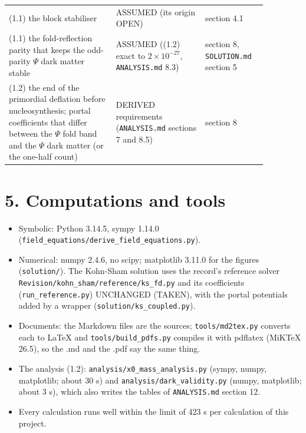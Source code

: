 \documentclass[11pt]{article}
\begin{document}
\begin{longtable}{>{\raggedright\arraybackslash}p{0.368\linewidth}>{\raggedright\arraybackslash}p{0.307\linewidth}>{\raggedright\arraybackslash}p{0.194\linewidth}}
{}(1.1) the block stabiliser & ASSUMED (its origin OPEN) & section 4.1 \\
{}(1.1) the fold-reflection parity that keeps the odd-parity $\Psi$ dark matter stable & ASSUMED ((1.2) exact to $2\times10^{-27}$, \texttt{ANALYSIS.\allowbreak{}md} 8.3) & section 8, \texttt{SOLUTION.\allowbreak{}md} section 5 \\
{}(1.2) the end of the primordial deflation before nucleosynthesis; portal coefficients that differ between the $\Psi$ fold band and the $\Psi$ dark matter (or the one-half count) & DERIVED requirements (\texttt{ANALYSIS.\allowbreak{}md} sections 7 and 8.5) & section 8 \\
\bottomrule
\end{longtable}

\section*{5. Computations and tools}

\begin{itemize}
\item Symbolic: Python 3.14.5, sympy 1.14.0 (\texttt{field\_\allowbreak{}equations/\allowbreak{}derive\_\allowbreak{}field\_\allowbreak{}equations.\allowbreak{}py}).
\item Numerical: numpy 2.4.6, no scipy; matplotlib 3.11.0 for the figures (\texttt{solution/\allowbreak{}}). The Kohn-Sham solution uses the record's reference solver \texttt{Revision/\allowbreak{}kohn\_\allowbreak{}sham/\allowbreak{}reference/\allowbreak{}ks\_\allowbreak{}fd.\allowbreak{}py} and its coefficients (\texttt{run\_\allowbreak{}reference.\allowbreak{}py}) UNCHANGED (TAKEN), with the portal potentials added by a wrapper (\texttt{solution/\allowbreak{}ks\_\allowbreak{}coupled.\allowbreak{}py}).
\item Documents: the Markdown files are the sources; \texttt{tools/\allowbreak{}md2tex.\allowbreak{}py} converts each to LaTeX and \texttt{tools/\allowbreak{}build\_\allowbreak{}pdfs.\allowbreak{}py} compiles it with pdflatex (MiKTeX 26.5), so the .md and the .pdf say the same thing.
\item The analysis (1.2): \texttt{analysis/\allowbreak{}x0\_\allowbreak{}mass\_\allowbreak{}analysis.\allowbreak{}py} (sympy, numpy, matplotlib; about 30 s) and \texttt{analysis/\allowbreak{}dark\_\allowbreak{}validity.\allowbreak{}py} (numpy, matplotlib; about 3 s), which also writes the tables of \texttt{ANALYSIS.\allowbreak{}md} section 12.
\item Every calculation runs well within the limit of 423 s per calculation of this project.
\end{itemize}
\end{document}
